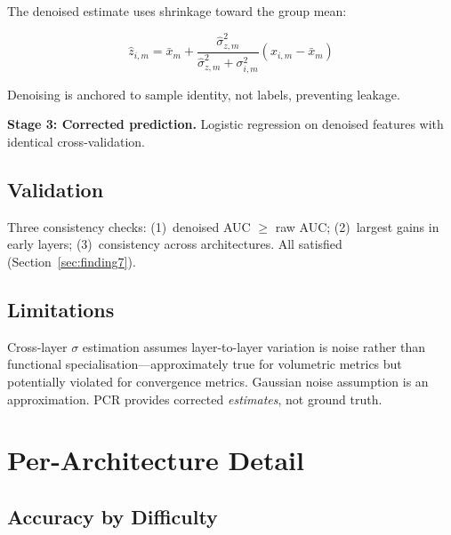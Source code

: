 \documentclass[11pt,twocolumn]{article}
\begin{document}
The denoised estimate uses shrinkage toward the group mean:

\begin{equation}
\hat{z}_{i,m} = \bar{x}_m + \frac{\hat{\sigma}_{z,m}^2}{\hat{\sigma}_{z,m}^2 + \sigma_{i,m}^2}(x_{i,m} - \bar{x}_m)
\end{equation}

Denoising is anchored to sample identity, not labels, preventing leakage.

\textbf{Stage 3: Corrected prediction.} Logistic regression on denoised features with identical cross-validation.

\subsection{Validation}

Three consistency checks: (1)~denoised AUC $\geq$ raw AUC; (2)~largest gains in early layers; (3)~consistency across architectures. All satisfied (Section~\ref{sec:finding7}).

\subsection{Limitations}

Cross-layer $\sigma$ estimation assumes layer-to-layer variation is noise rather than functional specialisation---approximately true for volumetric metrics but potentially violated for convergence metrics. Gaussian noise assumption is an approximation. PCR provides corrected \emph{estimates}, not ground truth.


\section{Per-Architecture Detail}
\label{app:architecture}

\subsection{Accuracy by Difficulty}
\end{document}

